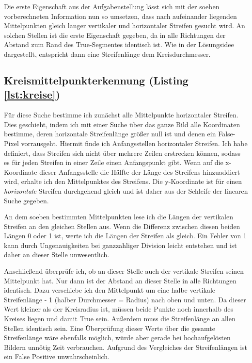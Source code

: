 Die erste Eigenschaft aus der Aufgabenstellung lässt sich mit der soeben vorberechneten Information nun so umsetzen, dass nach aufeinander liegenden Mittelpunkten gleich langer vertikaler und horizontaler Streifen gesucht wird.
An solchen Stellen ist die erste Eigenschaft gegeben, da in alle Richtungen der Abstand zum Rand des True-Segmentes identisch ist. Wie in der Lösungsidee dargestellt, entspricht dann eine Streifenlänge dem Kreisdurchmesser.

\subsection{Kreismittelpunkterkennung (Listing \ref{lst:kreise})}
Für diese Suche bestimme ich zunächst alle Mittelpunkte horizontaler Streifen. Dies geschieht, indem ich mit einer Suche über das ganze Bild alle Koordinaten bestimme, deren horizontale Streifenlänge größer null ist und denen ein False-Pixel vorrausgeht.
Hiermit finde ich Anfangsstellen horizontaler Streifen. Ich habe definiert, dass Streifen sich nicht über mehrere Zeilen erstrecken können, sodass es für jeden Streifen in einer Zeile einen Anfangspunkt gibt.
Wenn auf die x-Koordinate dieser Anfangsstelle die Hälfte der Länge des Streifens hinzuaddiert wird, erhalte ich den Mittelpunktes des Streifens.
Die y-Koordinate ist für einen \textit{horizontale} Streifen durchgehend gleich und ist daher aus der Schleife der linearen Suche gegeben.

An dem soeben bestimmten Mittelpunkten lese ich die Längen der vertikalen Streifen an den gleichen Stellen aus. Wenn die Differenz zwischen diesen beiden Längen 0 oder 1 ist, werte ich die Längen der Streifen als gleich.
Ein Fehler von 1 kann durch Ungenauigkeiten bei ganzzahliger Division leicht entstehen und ist daher an dieser Stelle unwesentlich.

Anschließend überprüfe ich, ob an dieser Stelle auch der vertikale Streifen seinen Mittelpunkt hat. Nur dann ist der Abstand an dieser Stelle in alle Richtungen identisch. Dazu verschiebe ich den Mittelpunkt um eine halbe vertikale Streifenlänge - 1 (halber Durchmesser = Radius) nach oben und unten. Da dieser Wert kleiner als der Kreisradius ist, müssen beide Punkte noch innerhalb des Kreises liegen und damit True sein. Außerdem muss die Streifenlänge an allen Stellen identisch sein.
Eine Überprüfung dieser Werte über die gesamte Streifenlänge wäre ebenfalls möglich, würde aber gerade bei hochaufgelösten Bildern unnötig Zeit verbrauchen. Aufgrund des Vergleiches der Streifenlängen ist ein False Positive unwahrscheinlich.

